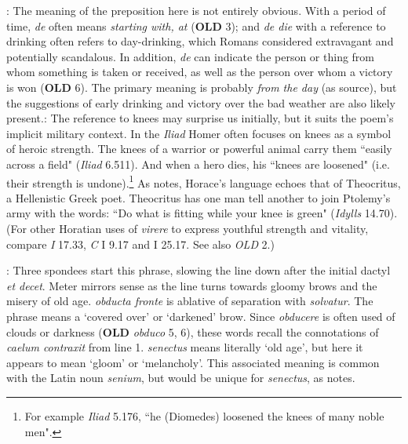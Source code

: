 : The meaning of the preposition here is not entirely obvious.  With a period of time, \textit{de} often means \textit{starting with, at} (\textbf{OLD} 3); and \textit{de die} with a reference to drinking often refers to day-drinking, which Romans considered extravagant and potentially scandalous.  In addition, \textit{de} can indicate the person or thing from whom something is taken or received, as well as the person over whom a victory is won (\textbf{OLD} 6).  The primary meaning is probably \textit{from the day} (as source), but the suggestions of early drinking and victory over the bad weather are also likely present.\indent{}: The reference to knees may surprise us initially, but it suits the poem's implicit military context.  In the \textit{Iliad} Homer often focuses on knees as a symbol of heroic strength.  The knees of a warrior or powerful animal carry them ``easily across a field" (\textit{Iliad} 6.511).  And when a hero dies, his ``knees are loosened" (i.e. their strength is undone).\footnote{For example \textit{Iliad} 5.176, ``he (Diomedes) loosened the knees of many noble men".}  As \citet[216--217]{mankin1995} notes, Horace's language echoes that of Theocritus, a Hellenistic Greek poet. Theocritus has one man tell another to join Ptolemy's army with the words: ``Do what is fitting while your knee is green" (\textit{Idylls} 14.70).  (For other Horatian uses of \textit{virere} to express youthful strength and vitality, compare \textit{I} 17.33, \textit{C} I 9.17 and I 25.17. See also \textit{OLD} 2.)


: Three spondees start this phrase, slowing the line down after the initial dactyl \textit{et decet}.  Meter mirrors sense as the line turns towards gloomy brows and the misery of old age.  \textit{obducta fronte} is ablative of separation with \textit{solvatur}.  The phrase means a `covered over' or `darkened' brow.  Since \textit{obducere} is often used of clouds or darkness (\textbf{OLD} \textit{obduco} 5, 6), these words recall the connotations of \textit{caelum contraxit} from line 1.  \textit{senectus} means literally `old age', but here it appears to mean `gloom' or `melancholy'.  This associated meaning is common with the Latin noun \textit{senium}, but would be unique for \textit{senectus}, as \citet[217]{mankin1995} notes.


